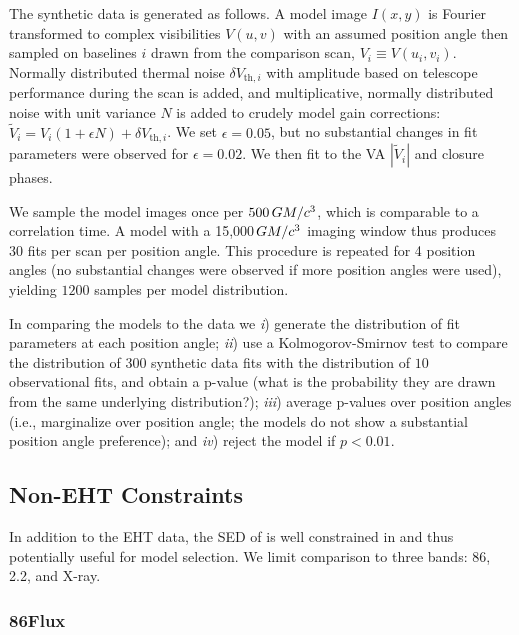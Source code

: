 The synthetic data is generated as follows.  A model image $I(x,y)$ is Fourier transformed to complex visibilities $V(u,v)$ with an assumed position angle then sampled on baselines $i$ drawn from the comparison scan, $V_i \equiv V(u_i,v_i)$.  Normally distributed thermal noise $\delta V_{\mathrm{th},i}$ with amplitude based on telescope performance during the scan is added, and multiplicative, normally distributed noise with unit variance $N$ is added to crudely model gain corrections: $\tilde{V}_i = V_i (1 + \epsilon N) + \delta V_{\mathrm{th},i}$.  We set $\epsilon = 0.05$, but no substantial changes in fit parameters were observed for $\epsilon = 0.02$.  We then fit to the VA $|\tilde{V}_i|$ and closure phases.

We sample the model images once per $500\,GM/c^3$, which is comparable to a correlation time.  A model with a 15,000\,$GM/c^3$ imaging window thus produces $30$ fits per scan per position angle.  This procedure is repeated for 4 position angles (no substantial changes were observed if more position angles were used), yielding $1200$ samples per model distribution.

In comparing the models to the data we
\emph{i}) generate the distribution of fit parameters at each position angle;
\emph{ii}) use a Kolmogorov-Smirnov test to compare the distribution of $300$ synthetic data fits with the distribution of $10$ observational fits, and obtain a p-value (what is the probability they are drawn from the same underlying distribution?);
\emph{iii}) average p-values over position angles (i.e., marginalize over position angle; the models do not show a substantial position angle preference); and
\emph{iv}) reject the model if $p < 0.01$.

\subsection{Non-EHT Constraints}

In addition to the EHT data, the SED of \sgra is well constrained in  and thus potentially useful for model selection.
We limit comparison to three bands: 86\GHz, 2.2\um, and X-ray.

\subsubsection{86\GHz Flux}

